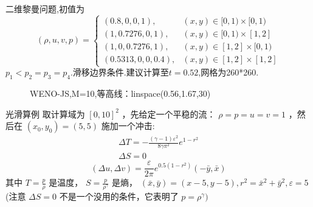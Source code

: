 \documentclass{book}
\begin{document}
\begin{example}{}{}
    二维黎曼问题\cite{RN13},初值为
    \begin{equation}
        (\rho, u, v, p)=\begin{cases}
            (0.8,0,0,1),      & (x, y) \in[0,1) \times[0,1) \\
            (1,0.7276,0,1),   & (x, y) \in[0,1) \times[1,2] \\
            (1,0,0.7276,1),   & (x, y) \in[1,2] \times[0,1) \\
            (0.5313,0,0,0.4), & (x, y) \in[1,2] \times[1,2]
        \end{cases}
    \end{equation}
    $p_1<p_2=p_3=p_4$.滑移边界条件.建议计算至$t=0.52$,网格为260*260.

    \begin{figure}[H]%
        \centering
        \quad
        \caption{WENO-JS,M=10,等高线：linspace(0.56,1.67,30)}
    \end{figure}
\end{example}
\begin{example}{光滑算例}{}
    取计算域为  $[0,10]^{2}$  ，先给定一个平稳的流： $\rho=p=u=v=1$  ，然后在  $\left(x_{0}, y_{0}\right)=(5,5)$  施加一个冲击:
    \begin{equation}
        \begin{array}{l}
            \Delta T=-\frac{(\gamma-1) \varepsilon^{2}}{8 \gamma \pi^{2}} e^{1-r^{2}} \\
            \Delta S=0
        \end{array}
    \end{equation}
    \begin{equation}
        (\Delta u, \Delta v)=\frac{\varepsilon}{2 \pi} e^{0.5\left(1-r^{2}\right)}(-\bar{y}, \bar{x})
    \end{equation}
    其中  $T=\frac{p}{\rho}$  是温度，  $S=\frac{p}{\rho^{\gamma}}$  是熵，  $(\bar{x}, \bar{y})=(x-5, y-5) , r^{2}=\bar{x}^{2}+\bar{y}^{2}, \varepsilon=5 $
    (注意 $\Delta S=0$ 不是一个没用的条件，它表明了 $ p=\rho^{\gamma}  )$
\end{example}
\end{document}
